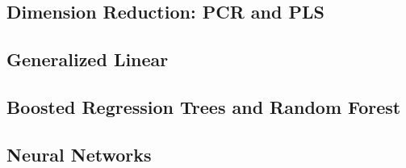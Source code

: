 \documentclass[12pt,a4paper,oneside]{book}
\begin{document}
\subsection{Dimension Reduction: PCR and PLS}
\subsection{Generalized Linear}
\subsection{Boosted Regression Trees and Random Forest}
\subsection{Neural Networks}
\end{document}
